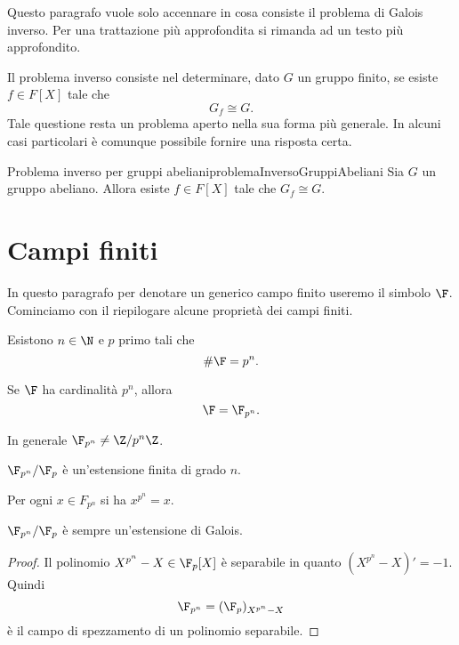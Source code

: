 Questo paragrafo vuole solo accennare in cosa consiste il problema di Galois inverso. Per una trattazione più approfondita si rimanda ad un testo più approfondito.

Il problema inverso consiste nel determinare, dato \(G\) un gruppo finito, se esiste \(f\in F[X]\) tale che
\[
	G_f \cong G.
\]
Tale questione resta un problema aperto nella sua forma più generale. In alcuni casi particolari è comunque possibile fornire una risposta certa.

\begin{teor}{Problema inverso per gruppi abeliani}{problemaInversoGruppiAbeliani}
	Sia \(G\) un gruppo abeliano.
	Allora esiste \(f\in F[X]\) tale che \(G_f \cong G\).
\end{teor}
%
%
\section{Campi finiti}

In questo paragrafo per denotare un generico campo finito useremo il simbolo \(\F\).
Cominciamo con il riepilogare alcune proprietà dei campi finiti.

\begin{pr}
	Esistono \(n\in\N\) e \(p\) primo tali che
	\[
		\# \F = p^n.
	\]
\end{pr}

\begin{pr}
	Se \(\F\) ha cardinalità \(p^n\), allora
	\[
		\F = \F_{p^n}.
	\]
\end{pr}

\begin{oss}
	In generale \(\F_{p^n}\neq \Z/p^n \Z\).
\end{oss}

\begin{pr}
	\(\F_{p^n}/\F_p\) è un'estensione finita di grado \(n\).
\end{pr}

\begin{pr}
	Per ogni \(x\in F_{p^n}\) si ha \(x^{p^n}=x\).
\end{pr}

\begin{pr}
	\(\F_{p^n}/\F_p\) è sempre un'estensione di Galois.
\end{pr}

\begin{proof}
	Il polinomio \(X^{p^n}-X\in \F_p[X]\) è separabile in quanto \((X^{p^n}-X)'=-1\). Quindi
	\[
		\F_{p^n} = (\F_p)_{X^{p^n}-X}
	\]
	è il campo di spezzamento di un polinomio separabile.
\end{proof}

